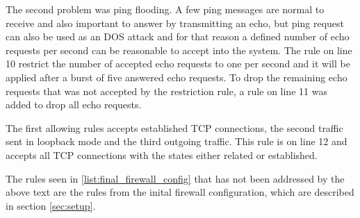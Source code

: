 The second problem was ping flooding. A few ping messages are normal to receive and also important to answer by transmitting an echo, but ping request can also be used as an DOS attack and for that reason a defined number of echo requests per second can be reasonable to accept into the system. The rule on line 10 restrict the number of accepted echo requests to one per second and it will be applied after a burst of five answered echo requests. To drop the remaining echo requests that was not accepted by the restriction rule, a rule on line 11 was added to drop all echo requests.

The first allowing rules accepts established TCP connections, the second traffic sent in loopback mode and the third outgoing traffic. This rule is on line 12 and accepts all TCP connections with the states either related or established.


The rules seen in \ref{list:final_firewall_config} that has not been addressed by the above text are the rules from the inital firewall configuration, which are described in section \ref{sec:setup}.


\label{list:final_firewall_config}



